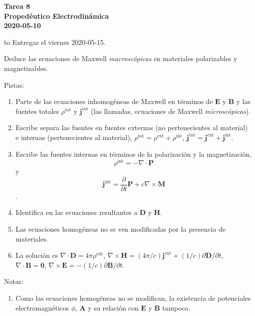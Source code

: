 \documentclass{exam}
\newenvironment{pistas}{\par\noindent Pistas:\begin{enumerate}} {\end{enumerate}}
\newenvironment{notas}{\par\noindent Notas:\begin{enumerate}} {\end{enumerate}}
\begin{document}
\begin{center}
  \bf\large Tarea 8\\
  Propedéutico Electrodinámica\\
  2020-05-10\\[20pt]
\end{center}
\hbox to \textwidth{Nombre: \enspace\hrulefill}
Entregar el viernes 2020-05-15.

\begin{questions}
\question\label{a} Deduce las ecuaciones de Maxwell {\em
    macroscópicas} en materiales
  polarizables y magnetizables.
  \begin{pistas}
  \item Parte de las ecuaciones inhomogéneas de Maxwell en términos de
    $\bm E$ y $\bm B$ y las fuentes totales $\rho^{\text{tot}}$ y
    $\bm j^{\text{tot}}$ (las llamadas, ecuaciones de Maxwell {\em microscópicas}).
  \item Escribe separa las fuentes en fuentes externas (no
    pertenecientes al material) e internas (pertenecientes al
    material), $\rho^{\text{tot}}=\rho^{\text{ext}}+\rho^{\text{int}}$,
    $\bm j^{\text{tot}}=\bm j^{\text{ext}}+\bm j^{\text{int}}$.
  \item Escribe las fuentes internas en términos de la polarización y
    la magnetización, $$\rho^{\text{int}}=-\nabla\cdot\bm P$$ y $$\bm
    j^{\text{int}}=\frac{\partial}{\partial t}\bm P+c\nabla\times\bm
    M$$.
  \item Identifica en las ecuaciones resultantes a $\bm D$ y $\bm H$.
  \item Las ecuaciones homogéneas no se ven modificadas por la
    presencia de materiales.
  \item La solución es $\nabla\cdot\bm D=4\pi\rho^{\text{ext}}$,
      $\nabla\times\bm H=(4\pi/c)\bm j^{\text{ext}}+(1/c)\partial\bm
      D/\partial t$, $\nabla\cdot\bm B=\bm 0$, $\nabla\times\bm
      E=-(1/c)\partial\bm B/\partial t$.
  \end{pistas}
  \begin{notas}
  \item Como las ecuaciones homogéneas no se modifican, la existencia
    de potenciales electromagnéticos $\phi$, $\bm A$ y su relación con
    $\bm E$ y $\bm B$ tampoco.
  \end{notas}


\end{questions}
\end{document}
